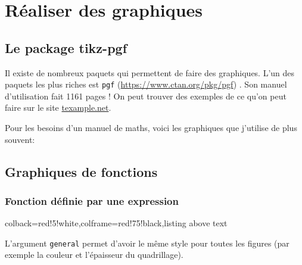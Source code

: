 \chapter{Réaliser des graphiques}
\thispagestyle{chapterpage}

\newpage

\section{Le package tikz-pgf}

Il existe de nombreux paquets qui permettent de faire des graphiques. L'un des paquets les plus riches est \verb|pgf| (\url{https://www.ctan.org/pkg/pgf}) . Son manuel d'utilisation fait 1161 pages ! On peut trouver des exemples de ce qu'on peut faire sur le site \href{http://www.texample.net/tikz/examples/area/mathematics/}{texample.net}.

Pour les besoins d'un manuel de maths, voici les graphiques que j'utilise de plus souvent:


\section{Graphiques de fonctions}

\subsection*{Fonction définie par une expression}



\begin{tcblisting}{colback=red!5!white,colframe=red!75!black,listing above text}
\end{tcblisting}







L'argument \verb|general| permet d'avoir le même style pour toutes les figures (par exemple la couleur et l'épaisseur du quadrillage).


